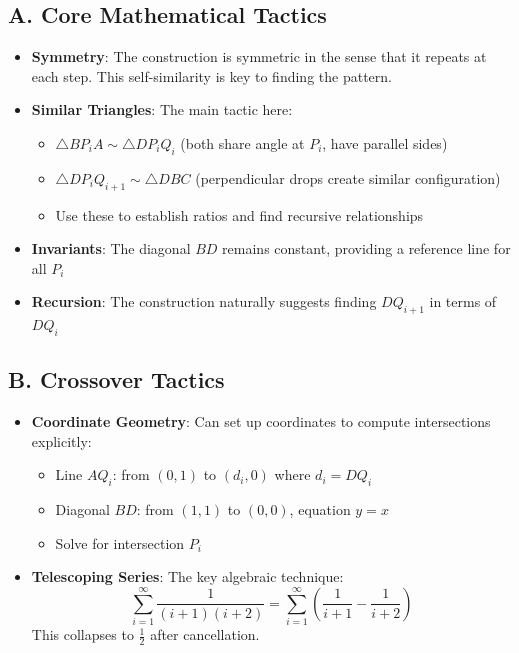 \documentclass[]{article}
\begin{document}
\begin{tacticalbox}
\subsection*{A. Core Mathematical Tactics}
\begin{itemize}[leftmargin=*]
    \item \textbf{Symmetry}: The construction is symmetric in the sense that it repeats at each step. This self-similarity is key to finding the pattern.
    
    \item \textbf{Similar Triangles}: The main tactic here:
    \begin{itemize}
        \item $\triangle BP_iA \sim \triangle DP_iQ_i$ (both share angle at $P_i$, have parallel sides)
        \item $\triangle DP_iQ_{i+1} \sim \triangle DBC$ (perpendicular drops create similar configuration)
        \item Use these to establish ratios and find recursive relationships
    \end{itemize}
    
    \item \textbf{Invariants}: The diagonal $BD$ remains constant, providing a reference line for all $P_i$
    
    \item \textbf{Recursion}: The construction naturally suggests finding $DQ_{i+1}$ in terms of $DQ_i$
\end{itemize}

\subsection*{B. Crossover Tactics}
\begin{itemize}[leftmargin=*]
    \item \textbf{Coordinate Geometry}: Can set up coordinates to compute intersections explicitly:
    \begin{itemize}
        \item Line $AQ_i$: from $(0,1)$ to $(d_i, 0)$ where $d_i = DQ_i$
        \item Diagonal $BD$: from $(1,1)$ to $(0,0)$, equation $y = x$
        \item Solve for intersection $P_i$
    \end{itemize}
    
    \item \textbf{Telescoping Series}: The key algebraic technique:
    \[\sum_{i=1}^{\infty} \frac{1}{(i+1)(i+2)} = \sum_{i=1}^{\infty} \left(\frac{1}{i+1} - \frac{1}{i+2}\right)\]
    This collapses to $\frac{1}{2}$ after cancellation.
\end{itemize}
\end{tacticalbox}
\end{document}
